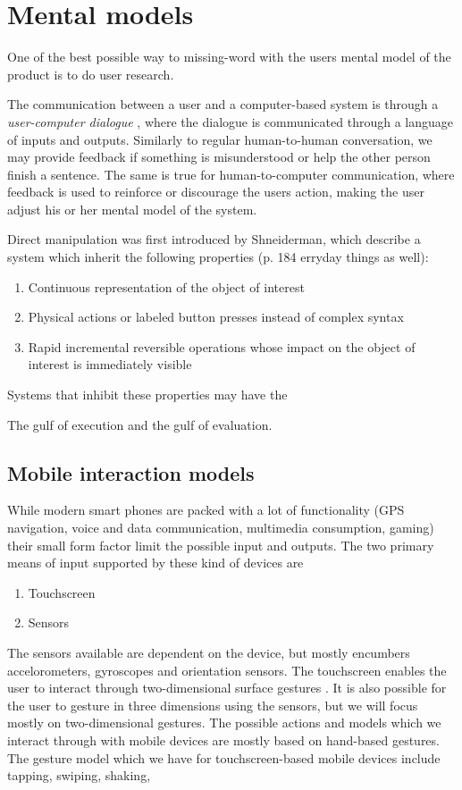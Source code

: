 \section{Mental models}

One of the best possible way to missing-word with the users mental model of the product is to do user research.

The communication between a user and a computer-based system is through a \textit{user-computer dialogue} \cite{Foley1996}, where the dialogue is communicated through a language of inputs and outputs. Similarly to regular human-to-human conversation, we may provide feedback if something is misunderstood or help the other person finish a sentence. The same is true for human-to-computer communication, where feedback is used to reinforce or discourage the users action, making the user adjust his or her mental model of the system.

Direct manipulation was first introduced by Shneiderman, which describe a system which inherit the following properties (p. 184 erryday things as well):

\begin{enumerate}
  \item Continuous representation of the object of interest
  \item Physical actions or labeled button presses instead of complex syntax
  \item Rapid incremental reversible operations whose impact on the object of interest is immediately visible
\end{enumerate}

Systems that inhibit these properties may have the

The gulf of execution and the gulf of evaluation.

\subsection{Mobile interaction models} %
While modern smart phones are packed with a lot of functionality (GPS navigation, voice and data communication, multimedia consumption, gaming) their small form factor limit the possible input and outputs. The two primary means of input supported by these kind of devices are
\begin{enumerate}
  \item Touchscreen
  \item Sensors
\end{enumerate}
The sensors available are dependent on the device, but mostly encumbers accelorometers, gyroscopes and orientation sensors. The touchscreen enables the user to interact through two-dimensional surface gestures \cite{Ruiz2011}. It is also possible for the user to gesture in three dimensions using the sensors, but we will focus mostly on two-dimensional gestures.
The possible actions and models which we interact through with mobile devices are mostly based on hand-based gestures. The gesture model which we have for touchscreen-based mobile devices include tapping, swiping, shaking,

